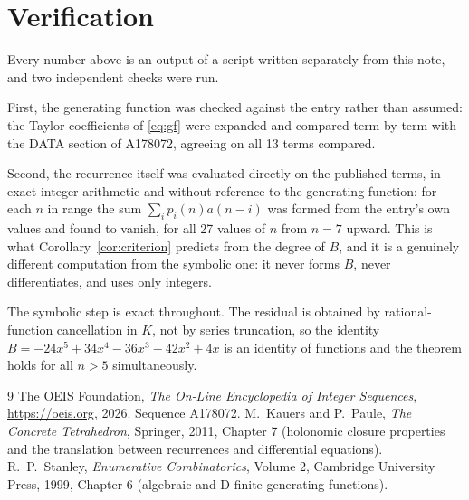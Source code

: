\documentclass[11pt,a4paper]{article}
\theoremstyle{plain}
\theoremstyle{definition}
\begin{document}
\section{Verification}

Every number above is an output of a script written separately from this note, and two
independent checks were run.

First, the generating function was checked against the entry rather than assumed: the
Taylor coefficients of \eqref{eq:gf} were expanded and compared term by term with the DATA
section of A178072, agreeing on all 13 terms compared.

Second, the recurrence itself was evaluated directly on the published terms, in exact
integer arithmetic and without reference to the generating function: for each $n$ in range
the sum $\sum_{i}p_{i}(n)a(n-i)$ was formed from the entry's own values and found to
vanish, for all 27 values of $n$ from $n=7$ upward. This is what
Corollary~\ref{cor:criterion} predicts from the degree of $B$, and it is a genuinely
different computation from the symbolic one: it never forms $B$, never differentiates, and
uses only integers.

The symbolic step is exact throughout. The residual is obtained by rational-function
cancellation in $K$, not by series truncation, so the identity $B=- 24 x^{5} + 34 x^{4} - 36 x^{3} - 42 x^{2} + 4 x$ is an
identity of functions and the theorem holds for all $n>5$ simultaneously.

\begin{thebibliography}{9}
 The OEIS Foundation, \emph{The On-Line Encyclopedia of Integer Sequences},
\url{https://oeis.org}, 2026. Sequence A178072.
 M.~Kauers and P.~Paule, \emph{The Concrete Tetrahedron}, Springer, 2011,
Chapter 7 (holonomic closure properties and the translation between recurrences and
differential equations).
 R.~P.~Stanley, \emph{Enumerative Combinatorics}, Volume 2, Cambridge
University Press, 1999, Chapter 6 (algebraic and D-finite generating functions).
\end{thebibliography}
\end{document}
